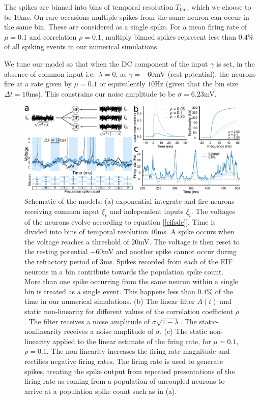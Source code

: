 \documentclass[%
 reprint,
 amsmath,amssymb,
 aps,
floatfix,
]{revtex4-1}
\begin{document}
The spikes are binned into bins of temporal resolution $T_\text{bin}$, which we choose to be $10$ms. On rare occasions multiple spikes from the same neuron can occur in the same bin. These are considered as a single spike. For a mean firing rate of $\mu=0.1$ and correlation $\rho=0.1$,  multiply binned spikes represent less than $0.4\%$ of all spiking events in our numerical simulations.

We tune our model so that when the DC component of the input $\gamma$ is set, in the absence of common input i.e.~$\lambda = 0$, as $\gamma = -60$mV (rest potential), the neurons fire at a rate given by $\mu = 0.1$ or equivalently $10$Hz (given that the bin size $\Delta t = 10$ms). This constrains our noise amplitude to be $\sigma = 6.23$mV.
\begin{figure}
\includegraphics{../R/fig_1/fig_1_final}
\caption{\label{fig:schematic} Schematic of the models: (a) exponential integrate-and-fire neurons receiving common input $\xi_c$ and independent inputs $\xi_i$. The voltages of the neurons evolve according to equation [\ref{eifsde}]. Time is divided into bins of temporal resolution $10$ms. A spike occurs when the voltage reaches a threshold of $20$mV. The voltage is then reset to the resting potential $-60$mV and another spike cannot occur during the refractory period of $3$ms. Spikes recorded from each of the EIF neurons in a bin contribute towards the population spike count. More than one spike occurring from the same neuron within a single bin is treated as a single event. This happens less than $0.4\%$ of the time in our numerical simulations. (b) The linear filter $A(t)$ and static non-linearity for different values of the correlation coefficient $\rho$. The filter receives a noise amplitude of $\sigma\sqrt{1-\lambda}$. The static-nonlinearity receives a noise amplitude of $\sigma$. (c) The static non-linearity applied to the linear estimate of the firing rate, for $\mu = 0.1$, $\rho = 0.1$. The non-linearity increases the firing rate magnitude and rectifies negative firing rates. The firing rate is used to generate spikes, treating the spike output from repeated presentations of the firing rate as coming from a population of uncoupled neurons to arrive at a population spike count such as in (a).}
\end{figure}
\end{document}
